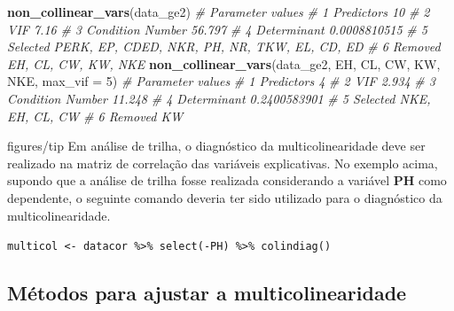 \documentclass[
]{book}
\newenvironment{Shaded}{\begin{snugshade}}{\end{snugshade}}
\newcommand{\CommentTok}[1]{\textcolor[rgb]{0.56,0.35,0.01}{\textit{#1}}}
\newcommand{\DataTypeTok}[1]{\textcolor[rgb]{0.13,0.29,0.53}{#1}}
\newcommand{\DecValTok}[1]{\textcolor[rgb]{0.00,0.00,0.81}{#1}}
\newcommand{\KeywordTok}[1]{\textcolor[rgb]{0.13,0.29,0.53}{\textbf{#1}}}
\newcommand{\NormalTok}[1]{#1}
\numberwithin{equation}{section}
\newenvironment{dica}
  {\begin{customBlockImage}[colframe=customBlue, title=Dica]{figures/tip}}
  {\end{customBlockImage}}
\begin{document}
\begin{Shaded}
\begin{Highlighting}[]
\KeywordTok{non\_collinear\_vars}\NormalTok{(data\_ge2)}
\CommentTok{\#          Parameter                                       values}
\CommentTok{\# 1       Predictors                                           10}
\CommentTok{\# 2              VIF                                         7.16}
\CommentTok{\# 3 Condition Number                                       56.797}
\CommentTok{\# 4      Determinant                                 0.0008810515}
\CommentTok{\# 5         Selected PERK, EP, CDED, NKR, PH, NR, TKW, EL, CD, ED}
\CommentTok{\# 6          Removed                          EH, CL, CW, KW, NKE}
\KeywordTok{non\_collinear\_vars}\NormalTok{(data\_ge2, EH, CL, CW, KW, NKE, }\DataTypeTok{max\_vif =} \DecValTok{5}\NormalTok{)}
\CommentTok{\#          Parameter          values}
\CommentTok{\# 1       Predictors               4}
\CommentTok{\# 2              VIF           2.934}
\CommentTok{\# 3 Condition Number          11.248}
\CommentTok{\# 4      Determinant    0.2400583901}
\CommentTok{\# 5         Selected NKE, EH, CL, CW}
\CommentTok{\# 6          Removed              KW}
\end{Highlighting}
\end{Shaded}

\begin{dica}
Em análise de trilha, o diagnóstico da multicolinearidade deve ser realizado na matriz de correlação das variáveis explicativas. No exemplo acima, supondo que a análise de trilha fosse realizada considerando a variável \textbf{PH} como dependente, o seguinte comando deveria ter sido utilizado para o diagnóstico da multicolinearidade.

\texttt{multicol\ \textless{}-\ datacor\ \%\textgreater{}\%\ select(-PH)\ \%\textgreater{}\%\ colindiag()}
\end{dica}

\hypertarget{muxe9todos-para-ajustar-a-multicolinearidade}{%
\subsection{Métodos para ajustar a multicolinearidade}\label{muxe9todos-para-ajustar-a-multicolinearidade}}
\end{document}
